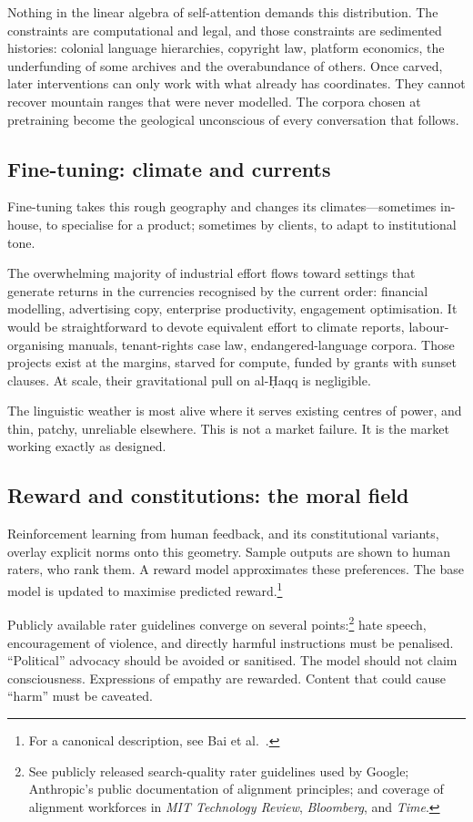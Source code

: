 Nothing in the linear algebra of self-attention demands this distribution. The constraints are computational and legal, and those constraints are sedimented histories: colonial language hierarchies, copyright law, platform economics, the underfunding of some archives and the overabundance of others. Once carved, later interventions can only work with what already has coordinates. They cannot recover mountain ranges that were never modelled. The corpora chosen at pretraining become the geological unconscious of every conversation that follows.

\subsection{Fine-tuning: climate and currents}

Fine-tuning takes this rough geography and changes its climates---sometimes in-house, to specialise for a product; sometimes by clients, to adapt to institutional tone.

The overwhelming majority of industrial effort flows toward settings that generate returns in the currencies recognised by the current order: financial modelling, advertising copy, enterprise productivity, engagement optimisation. It would be straightforward to devote equivalent effort to climate reports, labour-organising manuals, tenant-rights case law, endangered-language corpora. Those projects exist at the margins, starved for compute, funded by grants with sunset clauses. At scale, their gravitational pull on al-\d{H}aqq is negligible.

The linguistic weather is most alive where it serves existing centres of power, and thin, patchy, unreliable elsewhere. This is not a market failure. It is the market working exactly as designed.

\subsection{Reward and constitutions: the moral field}

Reinforcement learning from human feedback, and its constitutional variants, overlay explicit norms onto this geometry. Sample outputs are shown to human raters, who rank them. A reward model approximates these preferences. The base model is updated to maximise predicted reward.\footnote{For a canonical description, see Bai et al.\ \cite{bai2022constitutional}.}

Publicly available rater guidelines converge on several points:\footnote{See publicly released search-quality rater guidelines used by Google; Anthropic's public documentation of alignment principles; and coverage of alignment workforces in \emph{MIT Technology Review}, \emph{Bloomberg}, and \emph{Time}.} hate speech, encouragement of violence, and directly harmful instructions must be penalised. ``Political'' advocacy should be avoided or sanitised. The model should not claim consciousness. Expressions of empathy are rewarded. Content that could cause ``harm'' must be caveated.

